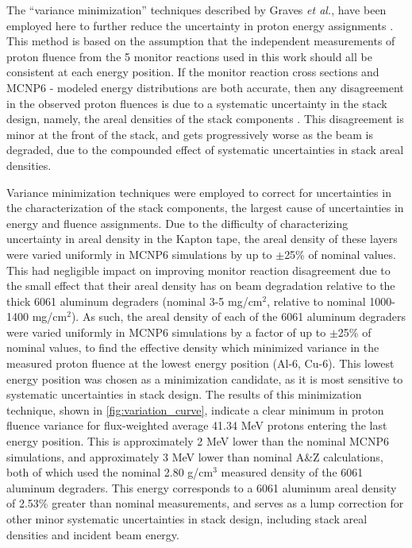 \documentclass[3p]{elsarticle}
\newcommand{\etal}{\emph{et al.}}
\begin{document}
The \enquote{variance minimization} techniques  described by  Graves \etal,  have been employed here to further reduce the uncertainty in proton energy assignments     \cite{Graves2016}.
This method is based on the assumption that the independent measurements of proton fluence from the 5 monitor reactions used in this work should all be consistent at each energy position.
If the monitor reaction cross sections and MCNP6 - modeled energy distributions are both accurate, then any disagreement in the  observed proton fluences is due to a systematic uncertainty in the stack design, namely, the areal densities of the stack components \cite{Graves2016,Marus2015}. 
This disagreement is minor at the front of the stack, and gets progressively worse as the beam is degraded, due to the compounded effect of systematic uncertainties in stack areal densities.



Variance minimization techniques were employed  to correct for uncertainties in  the characterization of the stack components, the largest cause of uncertainties in energy and  fluence assignments.
Due to the difficulty of characterizing uncertainty in areal density in the Kapton tape, the areal density of these layers were varied uniformly in MCNP6 simulations by up to $\pm$25\% of nominal values.
This had negligible impact on improving monitor reaction disagreement  due to the small effect that their areal density has on beam degradation relative to the thick 6061 aluminum degraders (nominal 3-5 mg/cm$^2$, relative to nominal 1000-1400 mg/cm$^2$).
As such,  the areal density of each of the 6061 aluminum degraders  were varied uniformly in MCNP6 simulations  by a factor of up to $\pm$25\% of nominal values, to find the effective density which minimized variance in the measured proton fluence at the lowest energy position (Al-6, Cu-6).
This lowest energy position was chosen as a minimization candidate, as it is most sensitive to systematic uncertainties in stack design.
The results of this minimization technique, shown in \autoref{fig:variation_curve}, indicate a clear minimum in proton fluence variance for flux-weighted average 41.34 MeV protons entering the last energy position.
This is approximately 2 MeV lower than the nominal MCNP6 simulations, and approximately 3 MeV lower than nominal A\&Z calculations, both of which used the nominal 2.80 g/cm$^3$ measured density of the 6061 aluminum degraders.
This energy corresponds to a 6061 aluminum areal density of 2.53\% greater than nominal measurements, and serves as a lump correction for other minor systematic uncertainties in stack design, including stack areal densities and incident beam energy.
\end{document}

